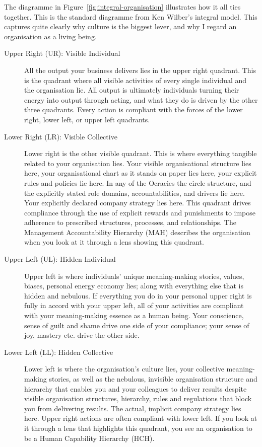 The diagramme in Figure~\ref{fig:integral-organisation} illustrates how it all ties together. This is the standard diagramme from Ken Wilber's integral model. This captures quite clearly why culture is the biggest lever, and why I regard an organisation as a living being.


\begin{description}
\item[Upper Right (UR): Visible Individual] All the output your business delivers lies in the upper right quadrant. This is the quadrant where all visible activities of every single individual and the organisation lie. All output is ultimately individuals turning their energy into output through acting, and what they do is driven by the other three quadrants. Every action is compliant with the forces of the lower right, lower left, or upper left quadrants.


\item[Lower Right (LR): Visible Collective] Lower right is the other visible quadrant. This is where everything tangible related to your organisation lies. Your visible organisational structure lies here, your organisational chart as it stands on paper lies here, your explicit rules and policies lie here. In any of the Ocracies the circle structure, and the explicitly stated role domains, accountabilities, and drivers lie here. Your explicitly declared company strategy lies here. This quadrant drives compliance through the use of explicit rewards and punishments to impose adherence to prescribed structures, processes, and relationships. The Management Accountability Hierarchy (MAH) describes the organisation when you look at it through a lens showing this quadrant.


\item[Upper Left (UL): Hidden Individual] Upper left is where individuals’ unique meaning\hyp{}making stories, values, biases, personal energy economy lies; along with everything else that is hidden and nebulous. If everything you do in your personal upper right is fully in accord with your upper left, all of your activities are compliant with your meaning\hyp{}making essence as a human being. Your conscience, sense of guilt and shame drive one side of your compliance; your sense of joy, mastery etc. drive the other side.


\item[Lower Left (LL): Hidden Collective] Lower left is where the organisation's culture lies, your collective meaning\hyp{}making stories, as well as the nebulous, invisible organisation structure and hierarchy that enables you and your colleagues to deliver results despite visible organisation structures, hierarchy, rules and regulations that block you from delivering results. The actual, implicit company strategy lies here. Upper right actions are often compliant with lower left. If you look at it through a lens that highlights this quadrant, you see an organisation to be a Human Capability Hierarchy (HCH).
\end{description}



